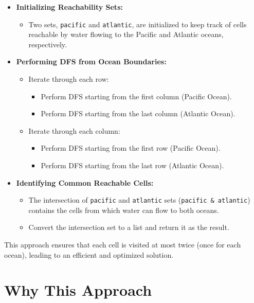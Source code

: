 \begin{itemize}
    \item \textbf{Initializing Reachability Sets:}
    \begin{itemize}
        \item Two sets, \texttt{pacific} and \texttt{atlantic}, are initialized to keep track of cells reachable by water flowing to the Pacific and Atlantic oceans, respectively.
    \end{itemize}
    
    \item \textbf{Performing DFS from Ocean Boundaries:}
    \begin{itemize}
        \item Iterate through each row:
        \begin{itemize}
            \item Perform DFS starting from the first column (Pacific Ocean).
            \item Perform DFS starting from the last column (Atlantic Ocean).
        \end{itemize}
        \item Iterate through each column:
        \begin{itemize}
            \item Perform DFS starting from the first row (Pacific Ocean).
            \item Perform DFS starting from the last row (Atlantic Ocean).
        \end{itemize}
    \end{itemize}
    
    \item \textbf{Identifying Common Reachable Cells:}
    \begin{itemize}
        \item The intersection of \texttt{pacific} and \texttt{atlantic} sets (\texttt{pacific \& atlantic}) contains the cells from which water can flow to both oceans.
        \item Convert the intersection set to a list and return it as the result.
    \end{itemize}
\end{itemize}

This approach ensures that each cell is visited at most twice (once for each ocean), leading to an efficient and optimized solution.

\section*{Why This Approach}


